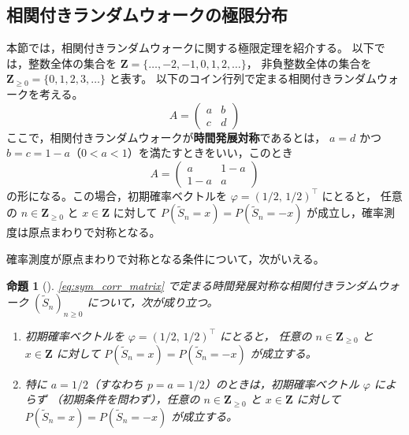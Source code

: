 \documentclass[a4j,dvipdfmx]{jsarticle}
\theoremstyle{plainnote}
\newtheorem{proposition}[theorem]{命題}
\begin{document}
\subsection{相関付きランダムウォークの極限分布}

本節では，相関付きランダムウォークに関する極限定理を紹介する。
以下では，整数全体の集合を
$\mathbf{Z}=\{\ldots,-2,-1,0,1,2,\ldots\}$，
非負整数全体の集合を
$\mathbf{Z}_{\geq 0}=\{0,1,2,3,\ldots\}$
と表す。
以下のコイン行列で定まる相関付きランダムウォークを考える。
\begin{equation}
  A = \begin{pmatrix} a & b \\ c & d \end{pmatrix}
\end{equation}
ここで，相関付きランダムウォークが\textbf{時間発展対称}であるとは，
$a = d$ かつ $b = c = 1 - a$（$0 < a < 1$）を満たすときをいい，このとき
\begin{equation}
  A = \begin{pmatrix} a & 1-a \\ 1-a & a \end{pmatrix}
  \label{eq:sym_corr_matrix}
\end{equation}
の形になる。この場合，初期確率ベクトルを $\varphi = (1/2,\,1/2)^\top$ にとると，
任意の $n \in \mathbf{Z}_{\geq 0}$ と $x \in \mathbf{Z}$ に対して
$P(\tilde{S}_n = x) = P(\tilde{S}_n = -x)$ が成立し，確率測度は原点まわりで対称となる。

確率測度が原点まわりで対称となる条件について，次がいえる。

\begin{proposition}[{\cite{refbook}}]
\label{prop:symmetry}
\eqref{eq:sym_corr_matrix} で定まる時間発展対称な相関付きランダムウォーク $(\tilde{S}_n)_{n \geq 0}$ について，次が成り立つ。
\begin{enumerate}
  \item 初期確率ベクトルを $\varphi = (1/2,\,1/2)^\top$ にとると，
        任意の $n \in \mathbf{Z}_{\geq 0}$ と $x \in \mathbf{Z}$ に対して
        $P(\tilde{S}_n = x) = P(\tilde{S}_n = -x)$ が成立する。
  \item 特に $a = 1/2$（すなわち $p = a = 1/2$）のときは，初期確率ベクトル $\varphi$ によらず
        （初期条件を問わず），任意の $n \in \mathbf{Z}_{\geq 0}$ と $x \in \mathbf{Z}$ に対して
        $P(\tilde{S}_n = x) = P(\tilde{S}_n = -x)$ が成立する。
\end{enumerate}
\end{proposition}
\end{document}
